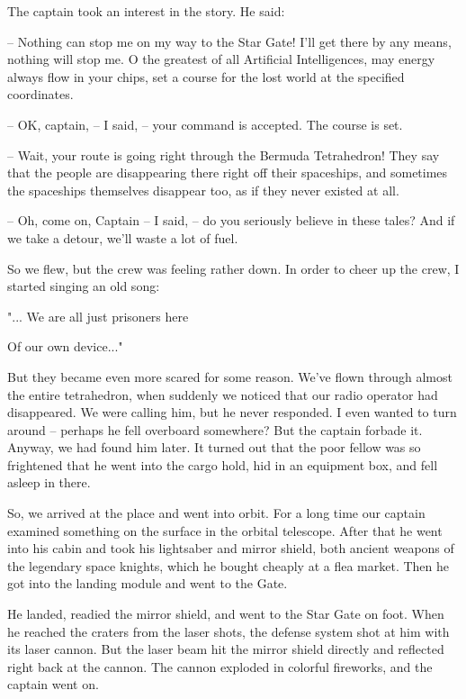 \documentclass[ebook,twoside,final,openright]{memoir}
\begin{document}
\par
The captain took an interest in the story. He said:\par
– Nothing can stop me on my way to the Star Gate! I'll get there by any means, nothing will stop me. O the greatest of all Artificial Intelligences, may energy always flow in your chips, set a course for the lost world at the specified coordinates.\par
– OK, captain, – I said, – your command is accepted. The course is set.\par
– Wait, your route is going right through the Bermuda Tetrahedron! They say that the people are disappearing there right off their spaceships, and sometimes the spaceships themselves disappear too, as if they never existed at all.\par
– Oh, come on, Captain – I said, – do you seriously believe in these tales? And if we take a detour, we’ll waste a lot of fuel.\par
\par
So we flew, but the crew was feeling rather down. In order to cheer up the crew, I started singing an old song: \par
 "... We are all just prisoners here \par
 Of our own device..." \par
 But they became even more scared for some reason. We’ve flown through almost the entire tetrahedron, when suddenly we noticed that our radio operator had disappeared. We were calling him, but he never responded. I even wanted to turn around – perhaps he fell overboard somewhere? But the captain forbade it. Anyway, we had found him later. It turned out that the poor fellow was so frightened that he went into the cargo hold, hid in an equipment box, and fell asleep in there.\par
\par
So, we arrived at the place and went into orbit. For a long time our captain examined something on the surface in the orbital telescope. After that he went into his cabin and took his lightsaber and mirror shield, both ancient weapons of the legendary space knights, which he bought cheaply at a flea market. Then he got into the landing module and went to the Gate.\par
\par
He landed, readied the mirror shield, and went to the Star Gate on foot. When he reached the craters from the laser shots, the defense system shot at him with its laser cannon. But the laser beam hit the mirror shield directly and reflected right back at the cannon. The cannon exploded in colorful fireworks, and the captain went on.\par
\end{document}
